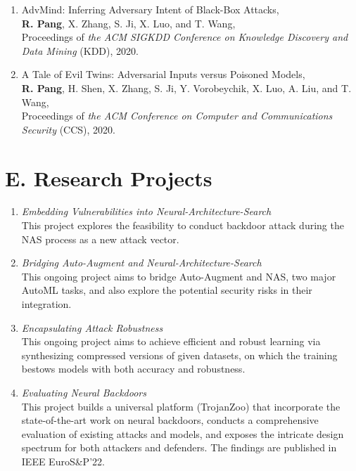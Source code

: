 \documentclass{resume}
\begin{document}
\begin{resume}
\begin{enumerate}[labelsep=15pt, parsep=8pt, resume]
\item AdvMind: Inferring Adversary Intent of Black-Box Attacks,\\
\textbf{R. Pang}, X. Zhang, S. Ji, X. Luo, and T. Wang,\\
Proceedings of {\it the ACM SIGKDD Conference on Knowledge Discovery and Data Mining} (KDD), 2020.

\item A Tale of Evil Twins: Adversarial Inputs versus Poisoned Models,\\
\textbf{R. Pang}, H. Shen, X. Zhang, S. Ji, Y. Vorobeychik, X. Luo, A. Liu, and T. Wang,\\
Proceedings of {\it the ACM Conference on Computer and Communications Security} (CCS), 2020.

\end{enumerate}

\vspace{0.2in} 
\section{E. Research Projects}
\vspace{24pt}

\begin{enumerate}[labelsep=18pt, parsep=8pt]

\item {\em Embedding Vulnerabilities into Neural-Architecture-Search}\\
This project explores the feasibility to conduct backdoor attack during the NAS process as a new attack vector.

\item {\em Bridging Auto-Augment and Neural-Architecture-Search}\\
This ongoing project aims to bridge Auto-Augment and NAS, two major AutoML tasks, and also explore the potential security risks in their integration.

\item {\em Encapsulating Attack Robustness}\\
This ongoing project aims to achieve efficient and robust learning via synthesizing compressed versions of given datasets, on which the training bestows models with both accuracy and robustness.  

\item {\em Evaluating Neural Backdoors}\\
This project builds a universal platform (TrojanZoo) that incorporate the state-of-the-art work on neural backdoors, conducts a comprehensive evaluation of existing attacks and models, and exposes the intricate design spectrum for both attackers and defenders. The findings are published in IEEE EuroS\&P'22.


\end{enumerate}
\end{resume}
\end{document}
